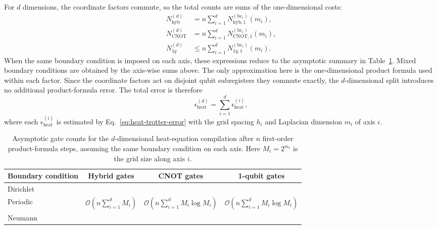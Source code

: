 \documentclass{article}
\begin{document}
For $d$ dimensions, the coordinate factors commute, so the total counts are sums of the one-dimensional costs:
\begin{align}
    N_{\mathrm{hyb}}^{(d)}
    &= n\sum_{i=1}^d N_{\mathrm{hyb},1}^{(\mathrm{bc}_i)}(m_i), \\
    N_{\mathrm{CNOT}}^{(d)}
    &= n\sum_{i=1}^d N_{\mathrm{CNOT},1}^{(\mathrm{bc}_i)}(m_i), \\
    N_{1q}^{(d)}
    &\le
    n\sum_{i=1}^d N_{1q,1}^{(\mathrm{bc}_i)}(m_i).
\end{align}
When the same boundary condition is imposed on each axis, these expressions reduce to the asymptotic summary in Table~\ref{tab:heat-gate-scaling}. Mixed boundary conditions are obtained by the axis-wise sums above. The only approximation here is the one-dimensional product formula used within each factor. Since the coordinate factors act on disjoint qubit subregisters they commute exactly, the $d$-dimensional split introduces no additional product-formula error. The total error is therefore
\begin{equation}
    \epsilon_{\mathrm{heat}}^{(d)} = \sum_{i=1}^d \epsilon_{\mathrm{heat}}^{(i)},
\end{equation}
where each $\epsilon_{\mathrm{heat}}^{(i)}$ is estimated by Eq.~\eqref{eq:heat-trotter-error} with the grid spacing $h_i$ and Laplacian dimension $m_i$ of axis $i$.

\begin{table}[htbp]
    \centering
    \caption{Asymptotic gate counts for the $d$-dimensional heat-equation compilation after $n$ first-order product-formula steps, assuming the same boundary condition on each axis. Here $M_i=2^{m_i}$ is the grid size along axis $i$.}
    \label{tab:heat-gate-scaling}
    \begin{tabular}{@{}lccc@{}}
        \toprule
        Boundary condition & Hybrid gates & CNOT gates & 1-qubit gates \\
        \midrule
        Dirichlet &
        &
        &
        \\
        Periodic &
        $\mathcal O\!\left(n\sum_{i=1}^d M_i\right)$ &
        $\mathcal O\!\left(n\sum_{i=1}^d M_i\log M_i\right)$ &
        $\mathcal O\!\left(n\sum_{i=1}^d M_i\log M_i\right)$ \\
        Neumann &
        &
        &
        \\
        \bottomrule
    \end{tabular}
\end{table}
\end{document}
